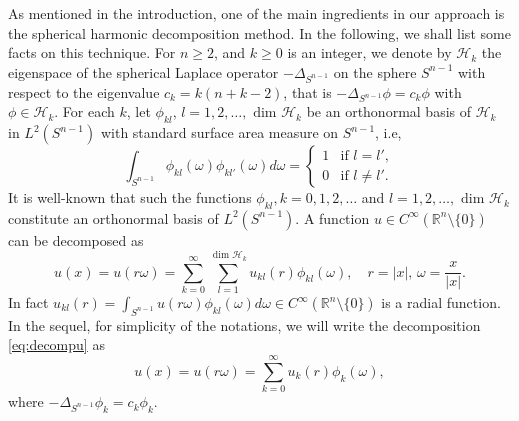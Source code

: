 \documentclass[a4paper,12pt]{article}
\theoremstyle{plain}
\theoremstyle{definition}
\theoremstyle{remark}
\def\R{\mathbb R}%
\numberwithin{equation}{section}
\begin{document}
As mentioned in the introduction, one of the main ingredients in our approach is the spherical harmonic decomposition method. In the following, we shall list some facts on this technique. For  $n \geq 2$, and $k \geq 0$ is an integer, we denote by $\mathcal H_k$  the eigenspace of the spherical Laplace operator $-\Delta_{S^{n-1}}$ on the sphere $S^{n-1}$ with respect to the eigenvalue $c_k = k (n+k -2)$, that is $-\Delta_{S^{n-1}} \phi = c_k \phi$ with $\phi \in \mathcal H_k$. For each $k$, let $\phi_{kl}$, $l =1,2,\ldots,\text{ dim }\mathcal H_k$ be an orthonormal basis of $\mathcal H_k$ in $L^2(S^{n-1})$ with standard surface area measure on $S^{n-1}$, i.e,
\[
\int_{S^{n-1}} \phi_{kl}(\omega)\phi_{kl'}(\omega) d\omega = \begin{cases}
1 &\mbox{if $l = l'$},\\
0 &\mbox{if $l\not= l'$}.
\end{cases}
\]
It is well-known that such the functions $\phi_{kl}, k =0,1,2, \ldots$ and $l =1,2,\dots,\text{ dim }\mathcal H_k$ constitute an orthonormal basis of $L^2(S^{n-1})$. A function $u\in C^\infty(\R^n\setminus\{0\})$ can be decomposed as
\begin{equation}\label{eq:decompu}
u(x) = u(r\omega) = \sum_{k=0}^\infty \sum_{l=1}^{\text{ dim } \mathcal H_k} u_{kl}(r) \phi_{kl}(\omega),\quad r = |x|,\, \omega = \frac{x}{|x|}.
\end{equation}
In fact $u_{kl}(r) = \int_{S^{n-1}} u(r\omega) \phi_{kl}(\omega) d\omega \in C^\infty(\R^n \setminus\{0\})$ is a radial function. In the sequel, for simplicity of the notations, we will write the decomposition \eqref{eq:decompu} as
\[
u(x) = u(r\omega) = \sum_{k=0}^\infty  u_{k}(r) \phi_{k}(\omega),
\]
where $-\Delta_{S^{n-1}} \phi_k = c_k \phi_k$.
\end{document}
